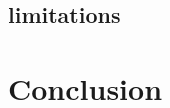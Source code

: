 \documentclass[a4paper,twoside]{article}
\begin{document}
\subsection{limitations}



\section{Conclusion}








 


\end{document}

